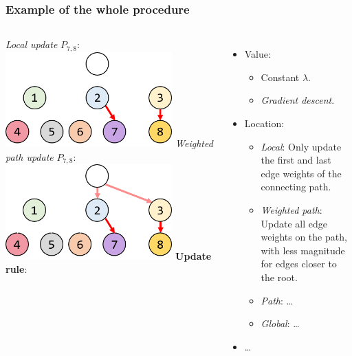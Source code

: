 \addtocounter{framenumber}{-1}
\begin{frame}
\frametitle{Example of the whole procedure}	
\begin{columns}[T]%
	\centering		
	\textit{Local update} $P_{7,8}$:
	\includegraphics[width=0.8\textwidth]{images/WLLTUpdateEnds}
	\textit{Weighted path update} $P_{7,8}$:
	\includegraphics[width=0.8\textwidth]{images/WLLTUpdatePath}
	\centering
	\textbf{Update rule}:
	\begin{itemize}
		\item[] Value:
		\begin{itemize}
			\item Constant $\lambda$.
			\item \textit{Gradient descent}.
		\end{itemize}
		\item[] Location:
		\begin{itemize}
			\item \textit{Local}: Only update the first and last edge weights of the connecting path.
			\item \textit{Weighted path}: Update all edge weights on the path, with less magnitude for edges closer to the root.
			\item \textit{Path}: \dots
			\item \textit{Global}: \dots		
		\end{itemize}
		\item[] \dots
	\end{itemize}		
\end{columns}
\end{frame}

